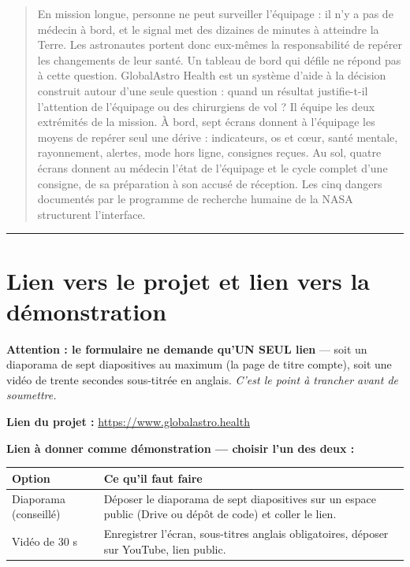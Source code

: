 \documentclass[11pt,a4paper]{article}
\let\sectionorig\section
\renewcommand{\section}{\Needspace{5\baselineskip}\sectionorig}
\begin{document}
\begin{quote}
En mission longue, personne ne peut surveiller l'\'equipage : il n'y a pas de m\'edecin \`a bord, et
le signal met des dizaines de minutes \`a atteindre la Terre. Les astronautes portent donc eux-m\^emes
la responsabilit\'e de rep\'erer les changements de leur sant\'e. Un tableau de bord qui d\'efile ne
r\'epond pas \`a cette question. GlobalAstro Health est un syst\`eme d'aide \`a la d\'ecision
construit autour d'une seule question : quand un r\'esultat justifie-t-il l'attention de l'\'equipage
ou des chirurgiens de vol ? Il \'equipe les deux extr\'emit\'es de la mission. \`A bord, sept \'ecrans
donnent \`a l'\'equipage les moyens de rep\'erer seul une d\'erive : indicateurs, os et c\oe{}ur,
sant\'e mentale, rayonnement, alertes, mode hors ligne, consignes re\c{c}ues. Au sol, quatre \'ecrans
donnent au m\'edecin l'\'etat de l'\'equipage et le cycle complet d'une consigne, de sa pr\'eparation
\`a son accus\'e de r\'eception. Les cinq dangers document\'es par le programme de recherche humaine
de la NASA structurent l'interface.
\end{quote}

\noindent\rule{\textwidth}{0.4pt}

\section{Lien vers le projet et lien vers la d\'emonstration}

\textbf{Attention : le formulaire ne demande qu'UN SEUL lien} --- soit un diaporama de sept
diapositives au maximum (la page de titre compte), soit une vid\'eo de trente secondes sous-titr\'ee
en anglais. \emph{C'est le point \`a trancher avant de soumettre.}

\vspace{0.2cm}
\textbf{Lien du projet :} \url{https://www.globalastro.health}

\vspace{0.2cm}
\textbf{Lien \`a donner comme d\'emonstration --- choisir l'un des deux :}

\begin{tabularx}{\textwidth}{@{}L{3.6cm} X@{}}
\toprule
\textbf{Option} & \textbf{Ce qu'il faut faire} \\
\midrule
Diaporama (conseill\'e) & D\'eposer le diaporama de sept diapositives sur un espace public (Drive ou d\'ep\^ot de code) et coller le lien. \\
Vid\'eo de 30 s & Enregistrer l'\'ecran, sous-titres anglais obligatoires, d\'eposer sur YouTube, lien public. \\
\bottomrule
\end{tabularx}
\end{document}
